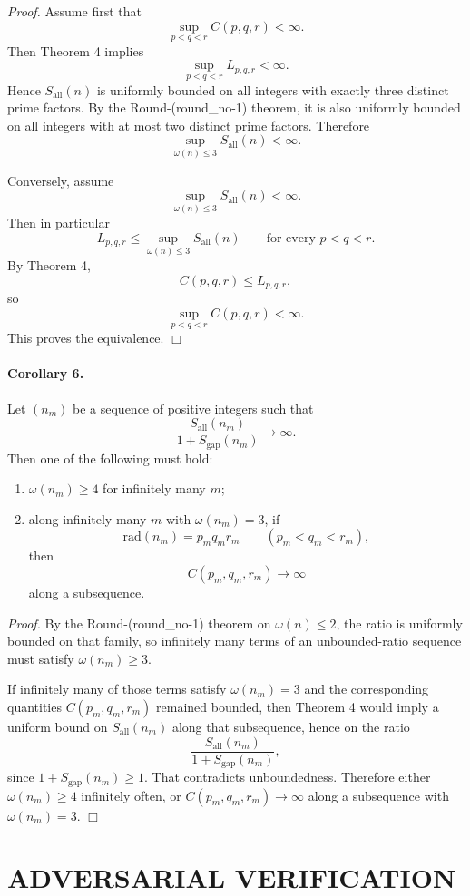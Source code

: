 \emph{Proof.}
Assume first that
\[
\sup_{p<q<r} C(p,q,r)<\infty.
\]
Then Theorem 4 implies
\[
\sup_{p<q<r} L_{p,q,r}<\infty.
\]
Hence \(S_{\mathrm{all}}(n)\) is uniformly bounded on all integers with exactly three distinct prime factors. By the Round-(round\_no-1) theorem, it is also uniformly bounded on all integers with at most two distinct prime factors. Therefore
\[
\sup_{\omega(n)\le 3} S_{\mathrm{all}}(n)<\infty.
\]

Conversely, assume
\[
\sup_{\omega(n)\le 3} S_{\mathrm{all}}(n)<\infty.
\]
Then in particular
\[
L_{p,q,r}\le \sup_{\omega(n)\le 3}S_{\mathrm{all}}(n)
\qquad\text{for every }p<q<r.
\]
By Theorem 4,
\[
C(p,q,r)\le L_{p,q,r},
\]
so
\[
\sup_{p<q<r} C(p,q,r)<\infty.
\]
This proves the equivalence.
\hfill\(\Box\)

\paragraph{Corollary 6.}
Let \((n_m)\) be a sequence of positive integers such that
\[
\frac{S_{\mathrm{all}}(n_m)}{1+S_{\mathrm{gap}}(n_m)}\to\infty.
\]
Then one of the following must hold:
\begin{enumerate}
\item \(\omega(n_m)\ge 4\) for infinitely many \(m\);
\item along infinitely many \(m\) with \(\omega(n_m)=3\), if
\[
\mathrm{rad}(n_m)=p_m q_m r_m
\qquad (p_m<q_m<r_m),
\]
then
\[
C(p_m,q_m,r_m)\to\infty
\]
along a subsequence.
\end{enumerate}

\emph{Proof.}
By the Round-(round\_no-1) theorem on \(\omega(n)\le 2\), the ratio is uniformly bounded on that family, so infinitely many terms of an unbounded-ratio sequence must satisfy \(\omega(n_m)\ge 3\).

If infinitely many of those terms satisfy \(\omega(n_m)=3\) and the corresponding quantities \(C(p_m,q_m,r_m)\) remained bounded, then Theorem 4 would imply a uniform bound on \(S_{\mathrm{all}}(n_m)\) along that subsequence, hence on the ratio
\[
\frac{S_{\mathrm{all}}(n_m)}{1+S_{\mathrm{gap}}(n_m)},
\]
since \(1+S_{\mathrm{gap}}(n_m)\ge 1\). That contradicts unboundedness. Therefore either \(\omega(n_m)\ge 4\) infinitely often, or \(C(p_m,q_m,r_m)\to\infty\) along a subsequence with \(\omega(n_m)=3\).
\hfill\(\Box\)

\section{ADVERSARIAL VERIFICATION}


